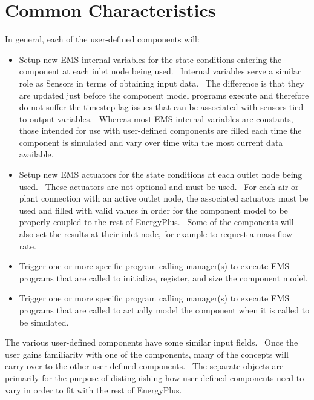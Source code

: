 \section{Common Characteristics}\label{common-characteristics}

In general, each of the user-defined components will:

\begin{itemize}
\item
  Setup new EMS internal variables for the state conditions entering the component at each inlet node being used.~ Internal variables serve a similar role as Sensors in terms of obtaining input data.~ The difference is that they are updated just before the component model programs execute and therefore do not suffer the timestep lag issues that can be associated with sensors tied to output variables.~ Whereas most EMS internal variables are constants, those intended for use with user-defined components are filled each time the component is simulated and vary over time with the most current data available.
\item
  Setup new EMS actuators for the state conditions at each outlet node being used.~ These actuators are not optional and must be used.~ For each air or plant connection with an active outlet node, the associated actuators must be used and filled with valid values in order for the component model to be properly coupled to the rest of EnergyPlus.~ Some of the components will also set the results at their inlet node, for example to request a mass flow rate.
\item
  Trigger one or more specific program calling manager(s) to execute EMS programs that are called to initialize, register, and size the component model.
\item
  Trigger one or more specific program calling manager(s) to execute EMS programs that are called to actually model the component when it is called to be simulated.
\end{itemize}

The various user-defined components have some similar input fields.~ Once the user gains familiarity with one of the components, many of the concepts will carry over to the other user-defined components.~ The separate objects are primarily for the purpose of distinguishing how user-defined components need to vary in order to fit with the rest of EnergyPlus.
